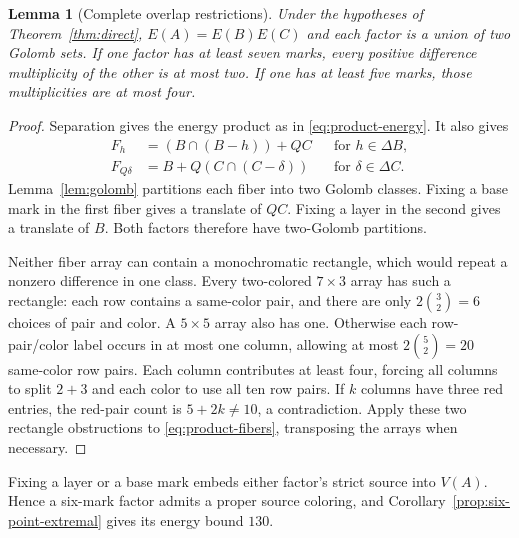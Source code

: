 \documentclass[11pt,a4paper]{article}
\newif\ifshowrevisions
\newcommand{\rev}[1]{{\ifshowrevisions\color{red}\fi #1}}
\newtheorem{lemma}[theorem]{Lemma}
\theoremstyle{definition}
\numberwithin{equation}{section}
\begin{document}
\begin{lemma}[Complete overlap restrictions]\label{lem:rectangles}
Under the hypotheses of Theorem~\ref{thm:direct}, $E(A)=E(B)E(C)$ and each factor is a union of two Golomb sets. If one factor has at least seven marks, every positive difference multiplicity of the other is at most two. If one has at least five marks, those multiplicities are at most four.
\end{lemma}
\begin{proof}
Separation gives the energy product as in \eqref{eq:product-energy}. It also gives
\begin{equation}\label{eq:product-fibers}
\begin{aligned}
F_h&=(B\cap(B-h))+QC &&\text{for }h\in\Delta B,\\
F_{Q\delta}&=B+Q(C\cap(C-\delta)) &&\text{for }\delta\in\Delta C.
\end{aligned}
\end{equation}
Lemma~\ref{lem:golomb} partitions each fiber into two Golomb classes. Fixing a base mark in the first fiber gives a translate of $QC$. Fixing a layer in the second gives a translate of $B$. Both factors therefore have two-Golomb partitions.

Neither fiber array can contain a monochromatic rectangle, which would repeat a nonzero difference in one class. Every two-colored $7\times3$ array has such a rectangle: each row contains a same-color pair, and there are only $2\binom32=6$ choices of pair and color. A $5\times5$ array also has one. Otherwise each row-pair/color label occurs in at most one column, allowing at most $2\binom52=20$ same-color row pairs. Each column contributes at least four, forcing all columns to split $2+3$ and each color to use all ten row pairs. If $k$ columns have three red entries, the red-pair count is $5+2k\ne10$, a contradiction. Apply these two rectangle obstructions to \eqref{eq:product-fibers}, transposing the arrays when necessary.
\end{proof}

\rev{Fixing a layer or a base mark embeds either factor's strict source into $V(A)$. Hence a six-mark factor admits a proper source coloring, and Corollary~\ref{prop:six-point-extremal} gives its energy bound $130$.}
\end{document}
